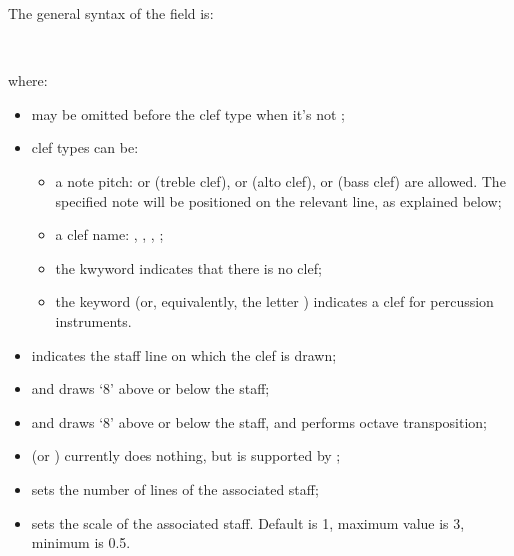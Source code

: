 \documentclass[a4paper,12pt]{book}
\begin{document}
The general syntax of the  field is:

\medskip

   
   \\
 

\medskip

where:

\begin{itemize}
  
  \item {} may be omitted before the clef type when it's not
  ;
  
  \item clef types can be:
  
  \begin{itemize}
    
    \item a note pitch:  or  (treble clef),  or
     (alto clef),  or  (bass clef) are allowed.
    The specified note will be positioned on the relevant line, as
    explained below;
    
    \item a clef name: , , ,  
    ;
    
    \item the kwyword  indicates that there is no clef;
    
    \item the keyword  (or, equivalently, the letter
    ) indicates a clef for percussion instruments.

  \end{itemize}

  \item {} indicates the staff line on which the clef
  is drawn;
  
  \item {} and  draws `8' above or below the staff;
  
  \item {} and  draws `8' above
  or below the staff, and performs octave transposition;
  
  \item {} (or ) currently does nothing, but
  is supported by \abcMID;
  
  \item {} sets the number of lines of the
  associated staff;
  
  \item {} sets the scale of the associated
  staff. Default is 1, maximum value is 3, minimum is 0.5.
  
\end{itemize}
\end{document}
